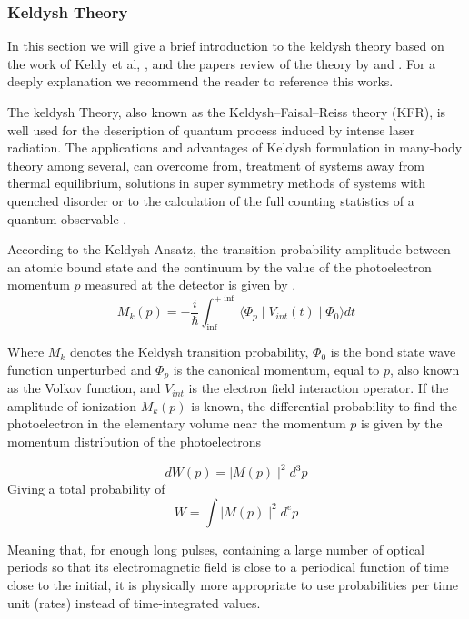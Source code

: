 \subsubsection{ Keldysh Theory}

In this section we will give a brief introduction to the keldysh theory based on the work of Keldy et al, \cite{keldysh_ionization_1965}, and the papers review of the theory by \cite{popruzhenko_keldysh_2014} and \cite{karnakov_strong_2009}. For a deeply explanation we recommend the reader to reference this works.

The keldysh Theory, also known as the Keldysh–Faisal–Reiss theory (KFR), is well used for the description of quantum process induced by intense laser radiation. The applications and advantages of Keldysh formulation in many-body theory among  several, can overcome from, treatment of systems away from thermal equilibrium, solutions in  super symmetry methods of systems with quenched disorder or to the  calculation of the full counting statistics of a quantum observable \cite{kamenev_introduction_nodate}.

According to the Keldysh Ansatz, the transition probability amplitude between an atomic bound state and the continuum by the value of the photoelectron momentum $p$ measured at the detector is given by \cite{popruzhenko_keldysh_2014}.
 \begin{equation}
 M_{k}(p) = -\dfrac{i}{\hbar} \int_{\inf}^{+\inf} \langle \Phi_{p}\mid  V_{int}(t)\mid \Phi_{0} \rangle dt
 \end{equation}

Where $M_{k}$ denotes the Keldysh transition probability, $\Phi_{0}$ is the bond state wave function unperturbed and $\Phi_{p}$ is the canonical momentum, equal to $p$, also known as the Volkov function, and $V_{int}$ is the electron field interaction operator. If the amplitude of ionization $M_{k}(p)$ is known, the differential probability to find the photoelectron in the elementary volume near the momentum $p$ is given by the momentum distribution of the photoelectrons 

\begin{equation}
dW(p)=\mid M(p)\mid^{2} d^{3}p
\end{equation}
 Giving a total probability of
 \begin{equation}
 W= \int \mid M(p)\mid^{2} d^{e}p
 \end{equation}
 
Meaning that, for enough long pulses, containing a large number of optical periods so that its electromagnetic field is close to a periodical function of time close to the initial, it is physically more appropriate to use probabilities per time unit (rates) instead of time-integrated values.


